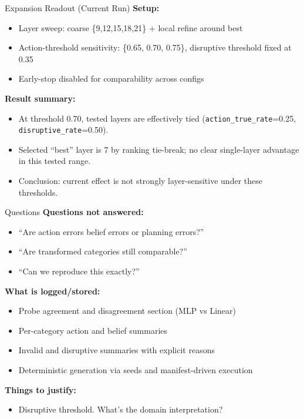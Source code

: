 \documentclass[aspectratio=169]{beamer}
\begin{document}
\begin{frame}{Expansion Readout (Current Run)}
\textbf{Setup:}
\begin{itemize}
  \item Layer sweep: coarse \{9,12,15,18,21\} + local refine around best
  \item Action-threshold sensitivity: \{0.65, 0.70, 0.75\}, disruptive threshold fixed at 0.35
  \item Early-stop disabled for comparability across configs
\end{itemize}

\vspace{0.3em}
\textbf{Result summary:}
\begin{itemize}
  \item At threshold 0.70, tested layers are effectively tied (\texttt{action\_true\_rate}=0.25, \texttt{disruptive\_rate}=0.50).
  \item Selected ``best'' layer is 7 by ranking tie-break; no clear single-layer advantage in this tested range.
  \item Conclusion: current effect is not strongly layer-sensitive under these thresholds.
\end{itemize}
\end{frame}


\begin{frame}{Questions}
\textbf{Questions not answered:}
\begin{itemize}
  \item ``Are action errors belief errors or planning errors?''
  \item ``Are transformed categories still comparable?''
  \item ``Can we reproduce this exactly?''
\end{itemize}

\vspace{0.4em}
\textbf{What is logged/stored:}
\begin{itemize}
  \item Probe agreement and disagreement section (MLP vs Linear)
  \item Per-category action and belief summaries
  \item Invalid and disruptive summaries with explicit reasons
  \item Deterministic generation via seeds and manifest-driven execution
\end{itemize}

\vspace{0.4em}
\textbf{Things to justify:}
\begin{itemize}
  \item Disruptive threshold. What's the domain interpretation?
\end{itemize}
\end{frame}
\end{document}
